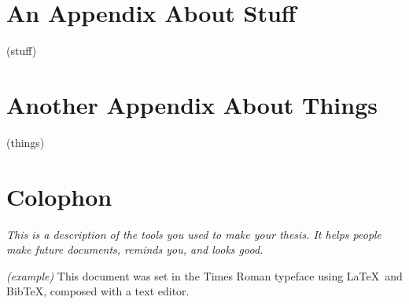 
\appendix
\chapter{An Appendix About Stuff}\label{appendixlabel1}
(stuff)

\chapter{Another Appendix About Things}\label{appendixlabel2}
(things)

\chapter{Colophon}\label{appendixlabel3}
\textit{This is a description of the tools you used to make your thesis. It helps people make future documents, reminds you, and looks good.}

\textit{(example)} This document was set in the Times Roman typeface using \LaTeX\ and Bib\TeX, composed with a text editor.


